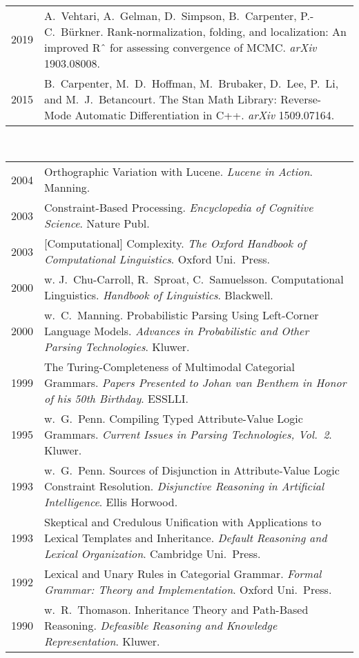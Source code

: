 \documentclass[10pt]{paper}
\newcommand{\heading}[1]{\noindent{\Large\bf\sffamily #1}\\[6pt]}
\newcommand{\publ}[2]{#1 & \begin{minipage}[t]{0.9\textwidth}#2\end{minipage}\\[4pt]}
\begin{document}
\heading{Open Articles}
%
\begin{tabular}{ll}
\publ{2019}{A.~Vehtari, A.~Gelman, D.~Simpson, B.~Carpenter,
  P.-C.~Bürkner.  Rank-normalization, folding, and localization: An
  improved Rˆ for assessing convergence of MCMC. {\sl\sffamily arXiv}
  1903.08008. \vspace*{6pt}}
\publ{2015}{B.~Carpenter, M.~D.~Hoffman, M.~Brubaker, D.~Lee, P.~Li,
  and M.~J.~Betancourt.  The Stan Math Library: Reverse-Mode Automatic
  Differentiation in C++. {\sl\sffamily arXiv} 1509.07164.}
\end{tabular}
\vspace*{12pt}

\heading{Book Chapters}
%
\begin{tabular}{ll}
\publ{2004}{Orthographic Variation with Lucene. {\sl\sffamily Lucene in Action}. Manning.}
\publ{2003}{Constraint-Based Processing. {\sl\sffamily Encyclopedia of Cognitive Science}. Nature Publ.}
\publ{2003}{[Computational] Complexity. {\sl\sffamily The Oxford Handbook of Computational Linguistics}. Oxford Uni.\ Press.}
\publ{2000}{w. J.~Chu-Carroll, R.~Sproat, C.~Samuelsson. Computational Linguistics. {\sl\sffamily Handbook of Linguistics}. Blackwell.\vspace*{6pt}}
\publ{2000}{w.\ C.~Manning. Probabilistic Parsing Using Left-Corner Language Models. {\sl\sffamily Advances in Probabilistic and Other Parsing Technologies}. Kluwer.\vspace{6pt}}
\publ{1999}{The Turing-Completeness of Multimodal Categorial Grammars. {\sl\sffamily Papers Presented to Johan van Benthem in Honor of his 50th Birthday}. ESSLLI.\vspace{6pt}}
\publ{1995}{w.\ G.~Penn. Compiling Typed Attribute-Value Logic Grammars. {\sl\sffamily Current Issues in Parsing Technologies, Vol.~2}. Kluwer.\vspace*{6pt}}
\publ{1993}{w.\ G.~Penn. Sources of Disjunction in Attribute-Value Logic Constraint Resolution. {\sl\sffamily Disjunctive Reasoning in Artificial Intelligence}. Ellis Horwood.\vspace{6pt}}
\publ{1993}{Skeptical and Credulous Unification with Applications to Lexical Templates and Inheritance. {\sl\sffamily Default Reasoning and Lexical Organization}. Cambridge Uni.~Press.\vspace{6pt}}
\publ{1992}{Lexical and Unary Rules in Categorial Grammar. {\sl\sffamily Formal Grammar: Theory and Implementation}. Oxford Uni.~Press.\vspace{6pt}}
\publ{1990}{w.\ R.~Thomason. Inheritance Theory and Path-Based Reasoning. {\sl\sffamily Defeasible Reasoning and Knowledge Representation}. Kluwer.}
\end{tabular}
\vspace*{14pt}
\end{document}

